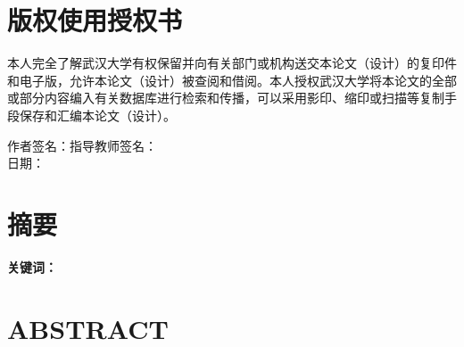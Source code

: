 \documentclass[UTF8,a4paper,zihao=-4,fontset=none]{ctexart}
\numberwithin{figure}{section}
\numberwithin{table}{section}
\numberwithin{equation}{section}
\begin{document}
\vspace{2em}
\section*{\heiti{} 版权使用授权书}
\songti{}
本人完全了解武汉大学有权保留并向有关部门或机构送交本论文（设计）的复印件和电子版，允许本论文（设计）被查阅和借阅。本人授权武汉大学将本论文的全部或部分内容编入有关数据库进行检索和传播，可以采用影印、缩印或扫描等复制手段保存和汇编本论文（设计）。

\vspace{2.5em}
\begin{center}
作者签名：\underline{\hspace{7em}}\hspace{4em}指导教师签名：\underline{\hspace{7em}}\\[1.2em]
日\hspace{1em}期：\underline{\hspace{10em}}
\end{center}

\clearpage
{}
\setcounter{page}{1}
\pagestyle{fancy}
\section*{\heiti{} 摘\hspace{1em}要}

\par\noindent\textbf{关键词：}

\clearpage
\section*{{\tnr\bfseries{} ABSTRACT}}

\par{}

\clearpage
\tableofcontents

\clearpage
{}
\setcounter{page}{1}
\makeatletter
\let\thesis@orig@section\section
\renewcommand{\section}{%
  \@ifstar{\thesis@section@star}{\thesis@section@nostar}%
}
\newcommand{\thesis@section@star}[1]{%
  \thesis@orig@section*{#1}%
}
\newcommand{\thesis@section@nostar}[1]{%
  \ifnum\value{section}>0\clearpage\fi
  \thesis@orig@section{#1}%
}
\makeatother

\end{document}
